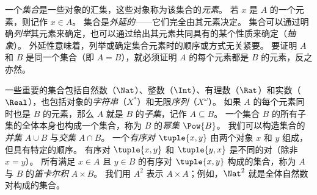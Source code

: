 一个\emph{集合}是一些对象的汇集，这些对象称为该集合的\emph{元素}。
若 $x$ 是 $A$ 的一个元素，则记作 $x \in A$。
集合是\emph{外延的}——它们完全由其元素决定。
集合可以通过明确\emph{列举}其元素来确定，也可以通过给出其元素共同具有的某个性质来确定（\emph{抽象}）。
外延性意味着，列举或确定集合元素时的顺序或方式无关紧要。
要证明 $A$ 和 $B$ 是同一个集合（即 $A = B$），就必须证明 $A$ 的每个元素都是 $B$ 的元素，反之亦然。

一些重要的集合包括自然数（$\Nat$）、整数（$\Int$）、有理数（$\Rat$）和实数（$\Real$），也包括对象的\emph{字符串}（$X^*$）和无限\emph{序列}（$X^\omega$）。
如果 $A$ 的每个元素同时也是 $B$ 的元素，那么 $A$ 就是 $B$ 的\emph{子集}，记作 $A \subseteq B$。
一个集合 $B$ 的所有子集的全体本身也构成一个集合，称为 $B$ 的\emph{幂集} $\Pow{B}$。
我们可以构造集合的\emph{并集} $A \cup B$ 与\emph{交集} $A \cap B$。
一个\emph{有序对} $\tuple{x, y}$ 由两个对象 $x$ 和 $y$ 组成，但具有特定的顺序。
有序对 $\tuple{x, y}$ 和 $\tuple{y, x}$ 是不同的对（除非 $x = y$）。
所有满足 $x \in A$ 且 $y \in B$ 的有序对 $\tuple{x, y}$ 构成的集合，称为 $A$ 与 $B$ 的\emph{笛卡尔积} $A \times B$。
我们用 $A^2$ 表示 $A \times A$；例如，$\Nat^2$ 就是全体自然数对构成的集合。